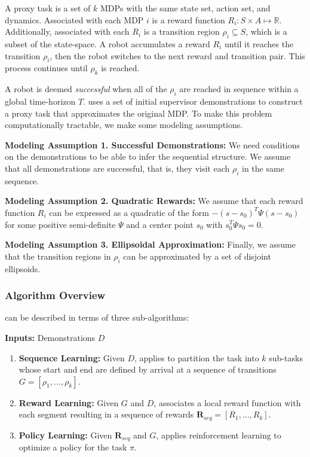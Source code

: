 \begin{definition}
A proxy task is a set of $k$ MDPs with the same state set, action set, and dynamics. 
Associated with each MDP $i$ is a reward function  $R_i: S \times A \mapsto \mathbb{R}$. Additionally, associated with each $R_i$ is a transition region $\rho_i \subseteq S$, which is a subset of the state-space. A robot accumulates a reward $R_i$ until it reaches the transition $\rho_i$, then the robot switches to the next reward and transition pair.
This process continues until $\rho_k$ is reached.
\end{definition}

A robot is deemed \emph{successful} when all of the $\rho_i$ are reached in sequence within a global time-horizon $T$. \hirl uses a set of initial supervisor demonstrations to construct a proxy task that approximates the original MDP. To make this problem computationally tractable, we make some modeling assumptions.

\vspace{0.5em}\noindent\textbf{Modeling Assumption 1. Successful Demonstrations: } We need conditions on the demonstrations to be able to infer the sequential structure. We assume that all demonstrations are successful, that is, they visit each $\rho_i$ in the same sequence.

\vspace{0.5em}\noindent\textbf{Modeling Assumption 2. Quadratic Rewards: } We assume that each reward function $R_i$ can be expressed as a quadratic of the form $-(s-s_0)^T \Psi (s - s_0)$ for some positive semi-definite $\Psi$ and a center point $s_0$ with $s_0^T \Psi s_0 = 0$. 

\vspace{0.5em}\noindent\textbf{Modeling Assumption 3. Ellipsoidal Approximation: } Finally, we assume that the transition regions in $\rho_i$ can be approximated by a set of disjoint ellipsoids.

\subsubsection{Algorithm Overview}
\hirl can be described in terms of three sub-algorithms:

\vspace{4pt}

\noindent\textbf{Inputs:} Demonstrations $D$
\begin{enumerate}
    \item \textbf{Sequence Learning: } Given $D$, \hirl applies \tsc to partition the task into $k$ sub-tasks whose start and end are defined by arrival at a sequence of transitions $G = [\rho_1,...,\rho_k]$.
    \item \textbf{Reward Learning: } Given $G$ and $D$, \hirl associates a local reward function with each segment resulting in a sequence of rewards $\mathbf{R}_{seq} = [R_1,...,R_k]$. 
    \item \textbf{Policy Learning: } Given $\mathbf{R}_{seq}$ and $G$, \hirl applies reinforcement learning to optimize a policy for the task $\pi$. 
\end{enumerate}

